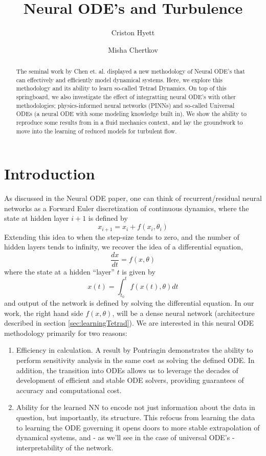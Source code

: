 \documentclass{amsart}
\begin{document}
\title{Neural ODE's and Turbulence}
\author{Criston Hyett}
\author{Misha Chertkov}

\maketitle

\begin{abstract}
  The seminal work by Chen et. al. displayed a new methodology of Neural ODE's that can effectively and efficiently model dynamical systems\cite{Chen2018}. Here, we explore this methodology and its ability to learn so-called Tetrad Dynamics\cite{Chertkov1999}. On top of this springboard, we also investigate the effect of integratting neural ODE's with other methodologies; physics-informed neural networks (PINNs) and so-called Universal ODEs (a neural ODE with some modeling knowledge built in). We show the ability to reproduce some results from \cite{Chen2018} in a fluid mechanics context, and lay the groundwork to move into the learning of reduced models for turbulent flow.
\end{abstract}
\vspace{0.5in}
\section{Introduction}
As discussed in the Neural ODE paper\cite{Chen2018}, one can think of recurrent/residual neural networks as a Forward Euler discretization of continuous dynamics, where the state at hidden layer $i+1$ is defined by 
\[
  x_{i+1} = x_i + f(x_i,\theta_i)
\]
Extending this idea to when the step-size tends to zero, and the number of hidden layers tends to infinity, we recover the idea of a differential equation,
\[
  \frac{dx}{dt} = f(x,\theta)
\]
where the state at a hidden ``layer'' $t$ is given by
\[
  x(t) = \int_{t_0}^t f(x(t),\theta)dt
\]
and output of the network is defined by solving the differential equation. In our work, the right hand side $f(x,\theta)$, will be a dense neural network (architecture described in section \ref{sec:learningTetrad}). We are interested in this neural ODE methodology primarily for two reasons:
\begin{enumerate}
\item Efficiency in calculation. A result by Pontriagin\cite{pontriagin1962} demonstrates the ability to perform sensitivity analysis in the same cost as solving the defined ODE. In addition, the transition into ODEs allows us to leverage the decades of development of efficient and stable ODE solvers, providing guarantees of accuracy and computational cost.
\item Ability for the learned NN to encode not just information about the data in question, but importantly, its structure. This refocus from learning the data to learning the ODE governing it opens doors to more stable extrapolation of dynamical systems, and - as we'll see in the case of universal ODE's - interpretability of the network.
\end{enumerate}
\end{document}
